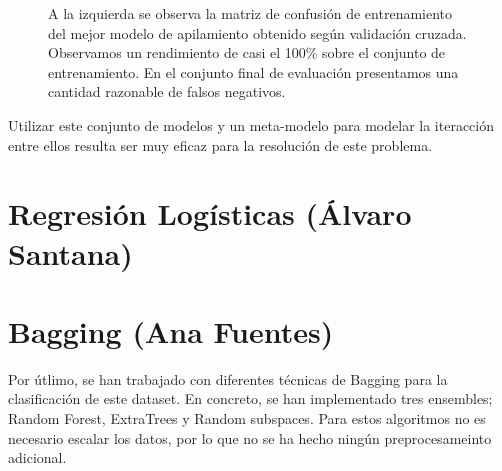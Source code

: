 \documentclass[12pt,letterpaper]{article}
\begin{document}
\begin{figure}[!ht]
\centering
{}
\caption{A la izquierda se observa la matriz de confusión de entrenamiento del mejor modelo de apilamiento obtenido según validación cruzada. Observamos un rendimiento de casi el 100\% sobre el conjunto de entrenamiento.
En el conjunto final de evaluación presentamos una cantidad razonable de falsos negativos.}
\label{fig:StackingMatrix}
\end{figure}

Utilizar este conjunto de modelos y un meta-modelo para modelar la iteracción entre ellos resulta ser muy eficaz para la resolución de este problema.


\section{Regresión Logísticas (Álvaro Santana)}
\section{Bagging (Ana Fuentes)}

Por útlimo, se han trabajado con diferentes técnicas de Bagging para la clasificación de este dataset. En concreto, se han implementado tres ensembles; Random Forest, ExtraTrees y Random subspaces. Para estos algoritmos no es necesario escalar los datos, por lo que no se ha hecho ningún preprocesameinto adicional.
\end{document}
